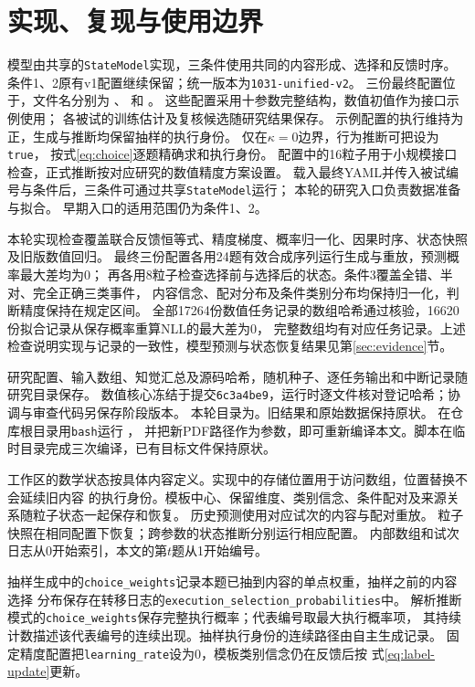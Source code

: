 \documentclass[11pt,a4paper]{article}
\numberwithin{equation}{section}
\begin{document}
\section{实现、复现与使用边界}
\label{sec:implementation}
模型由共享的\texttt{StateModel}实现，三条件使用共同的内容形成、选择和反馈时序。
条件1、2原有v1配置继续保留；统一版本为\texttt{1031-unified-v2}。
三份最终配置位于，文件名分别为
、
和
。
这些配置采用十参数完整结构，数值初值作为接口示例使用；
各被试的训练估计及复核候选随研究结果保存。
示例配置的执行维持为正，生成与推断均保留抽样的执行身份。
仅在$\kappa=0$边界，行为推断可把设为\texttt{true}，
按式\eqref{eq:choice}逐题精确求和执行身份。
配置中的16粒子用于小规模接口检查，正式推断按对应研究的数值精度方案设置。
载入最终YAML并传入被试编号与条件后，三条件可通过共享\texttt{StateModel}运行；
本轮的研究入口负责数据准备与拟合。
早期入口的适用范围仍为条件1、2。

本轮实现检查覆盖联合反馈恒等式、精度梯度、概率归一化、因果时序、状态快照及旧版数值回归。
最终三份配置各用24题有效合成序列运行生成与重放，预测概率最大差均为0；
再各用8粒子检查选择前与选择后的状态。条件3覆盖全错、半对、完全正确三类事件，
内容信念、配对分布及条件类别分布均保持归一化，判断精度保持在规定区间。
全部17264份数值任务记录的数组哈希通过核验，16620份拟合记录从保存概率重算NLL的最大差为0，
完整数组均有对应任务记录。上述检查说明实现与记录的一致性，模型预测与状态恢复结果见第\ref{sec:evidence}节。

研究配置、输入数组、知觉汇总及源码哈希，随机种子、逐任务输出和中断记录随研究目录保存。
数值核心冻结于提交\texttt{6c3a4be9}，运行时逐文件核对登记哈希；协调与审查代码另保存阶段版本。
本轮目录为。旧结果和原始数据保持原状。
在仓库根目录用\texttt{bash}运行
，
并把新PDF路径作为参数，即可重新编译本文。脚本在临时目录完成三次编译，已有目标文件保持原状。

工作区的数学状态按具体内容定义。实现中的存储位置用于访问数组，位置替换不会延续旧内容
的执行身份。模板中心、保留维度、类别信念、条件配对及来源关系随粒子状态一起保存和恢复。
历史预测使用对应试次的内容与配对重放。
粒子快照在相同配置下恢复；跨参数的状态推断分别运行相应配置。
内部数组和试次日志从0开始索引，本文的第$t$题从1开始编号。

抽样生成中的\texttt{choice\_weights}记录本题已抽到内容的单点权重，抽样之前的内容选择
分布保存在转移日志的\texttt{execution\_selection\_probabilities}中。
解析推断模式的\texttt{choice\_weights}保存完整执行概率；代表编号取最大执行概率项，
其持续计数描述该代表编号的连续出现。抽样执行身份的连续路径由自主生成记录。
固定精度配置把\texttt{learning\_rate}设为0，模板类别信念仍在反馈后按
式\eqref{eq:label-update}更新。
\end{document}
